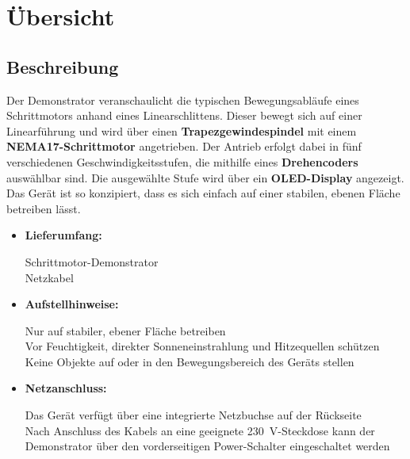 \documentclass[a4paper,12pt]{report}
\begin{document}
	\chapter{Übersicht}
	\section{Beschreibung}
	
	Der Demonstrator veranschaulicht die typischen Bewegungsabläufe eines Schrittmotors anhand eines Linearschlittens. Dieser bewegt sich auf einer Linearführung und wird über einen \textbf{Trapezgewindespindel} mit einem \textbf{NEMA17-Schrittmotor} angetrieben. Der Antrieb erfolgt dabei in fünf verschiedenen Geschwindigkeitsstufen, die mithilfe eines \textbf{Drehencoders} auswählbar sind. Die ausgewählte Stufe wird über ein \textbf{OLED-Display} angezeigt. Das Gerät ist so konzipiert, dass es sich einfach auf einer stabilen, ebenen Fläche betreiben lässt.\\ 
	
	\begin{itemize}[leftmargin=1.5em]
		 
		
		\item\textbf{Lieferumfang:} 
		
		Schrittmotor-Demonstrator\\
		
		Netzkabel\\
		
		\item\textbf{Aufstellhinweise:} 
		
		Nur auf stabiler, ebener Fläche betreiben\\
		Vor Feuchtigkeit, direkter Sonneneinstrahlung und Hitzequellen schützen\\
		
		Keine Objekte auf oder in den Bewegungsbereich des Geräts stellen\\
		
		\item\textbf{Netzanschluss:}  
		
		Das Gerät verfügt über eine integrierte Netzbuchse auf der Rückseite\\
		
		Nach Anschluss des Kabels an eine geeignete 230\ V-Steckdose kann der Demonstrator über den vorderseitigen Power-Schalter eingeschaltet werden\\
		
	\end{itemize}
	\newpage
	
\end{document}

